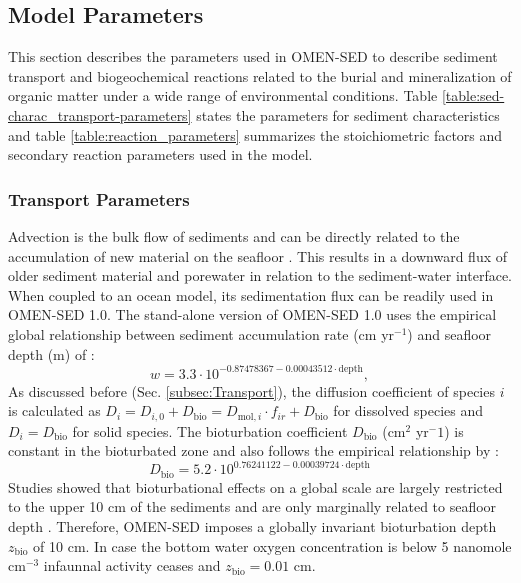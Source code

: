 \documentclass[gmd, manuscript]{copernicus}
\begin{document}
\subsection{Model Parameters}
This section describes the parameters used in OMEN-SED to describe sediment transport and biogeochemical reactions related to the burial and mineralization of organic matter under a wide range of environmental conditions. 
Table \ref{table:sed-charac_transport-parameters} states the parameters for sediment characteristics and table \ref{table:reaction_parameters} summarizes the stoichiometric factors and 
secondary reaction parameters used in the model.

\subsubsection{Transport Parameters}
Advection is the bulk flow of sediments and can be directly related to the accumulation of new material on the seafloor \citep[i.e. sedimentation,][]{burdige2006geochemistry}. 
This results in a downward flux of older sediment material and porewater in relation to the sediment-water interface. When coupled to an ocean model, its sedimentation flux can be readily used in OMEN-SED 1.0. 
The stand-alone version of OMEN-SED 1.0 uses the empirical global relationship between 
sediment accumulation rate (cm yr$^{-1}$) and seafloor depth (m) of \citet{middelburg_empirical_1997}: 
\begin{equation}
 w = 3.3\cdot 10^{-0.87478367-0.00043512\cdot \text{depth}}\label{eq:sedimentation_rate},
\end{equation}
As discussed before (Sec. \ref{subsec:Transport}), the diffusion coefficient of species $i$ is calculated as $D_i=D_{i,0}+D_{\mathrm{bio}}=D_{\mathrm{mol},i}\cdot f_{ir}+D_{\mathrm{bio}}$ for dissolved species and $D_i=D_{\mathrm{bio}}$ for solid species. 
The bioturbation coefficient $D_{\mathrm{bio}}$ (cm$^2$ yr$^-1$) is constant in the bioturbated zone and also follows the empirical relationship by \citet{middelburg_empirical_1997}:
\begin{equation}
 D_{\mathrm{bio}} = 5.2\cdot 10^{0.76241122-0.00039724\cdot \text{depth}}\label{eq:bioturbation_coeff}
\end{equation}
Studies showed that bioturbational effects on a global scale are largely restricted to the upper 10 cm of the sediments and are only marginally related to seafloor depth \citep[e.g.][]{boudreau_mean_1998, teal_global_2010}. 
Therefore, OMEN-SED imposes a globally invariant bioturbation depth $z_{\mathrm{bio}}$ of 10 cm. In case the bottom water oxygen concentration is below 5 nanomole cm$^{-3}$ 
infaunnal activity ceases and $z_{\mathrm{bio}} = 0.01$ cm. 
\end{document}
